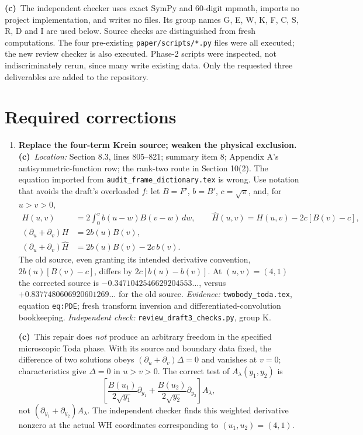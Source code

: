 \documentclass[11pt,a4paper]{article}
\newcommand{\C}{\textbf{(c)}\ }
\newcommand{\file}[1]{\nolinkurl{#1}}
\newcommand{\test}[1]{\textit{Independent check:} \file{review_draft3_checks.py}, group #1.}
\begin{document}
\C The independent checker uses exact SymPy and 60-digit mpmath, imports
no project implementation, and writes no files. Its group names G, E, W,
K, F, C, S, R, D and I are used below. Source checks are distinguished from
fresh computations. The four pre-existing \file{paper/scripts/*.py} files
were all executed; the new review checker is also executed. Phase-2 scripts
were inspected, not indiscriminately rerun, since many write existing data.
Only the requested three deliverables are added to the repository.

\section{Required corrections}
\begin{enumerate}[label=\textbf{R\arabic*.},leftmargin=*,itemsep=1.2em]

\item \textbf{Replace the four-term Krein source; weaken the physical exclusion.}
\C \textit{Location:} Section 8.3, lines 805--821; summary item 8;
Appendix A's antisymmetric-function row; the rank-two route in Section 10(2).
The equation imported from \file{audit_frame_dictionary.tex} is wrong.
Use notation that avoids the draft's overloaded $f$: let
$B=F'$, $b=B'$, $c=\sqrt\pi$, and, for $u>v>0$,
\begin{align}
 H(u,v)&=2\int_0^v b(u-w)B(v-w)\,dw,\qquad
 \widehat H(u,v)=H(u,v)-2c[B(v)-c],\label{rev:H}\\
 (\partial_u+\partial_v)H&=2b(u)B(v),\\
 (\partial_u+\partial_v)\widehat H&=2b(u)B(v)-2c\,b(v).
 \label{rev:source}
\end{align}
The old source, even granting its intended derivative convention,
$2b(u)[B(v)-c]$, differs by $2c[b(u)-b(v)]$.
At $(u,v)=(4,1)$ the corrected source is
$-0.3471042546629204553\ldots$, versus
$+0.8377480606920601269\ldots$ for the old source.
\textit{Evidence:} \file{twobody_toda.tex}, equation \file{eq:PDE};
fresh transform inversion and differentiated-convolution bookkeeping.
\test{K}

\C This repair does \emph{not} produce an arbitrary freedom in the
specified microscopic Toda phase. With its source and boundary data fixed,
the difference of two solutions obeys
$(\partial_u+\partial_v)\Delta=0$ and vanishes at $v=0$;
characteristics give $\Delta=0$ in $u>v>0$.
The correct test of $A_\lambda(y_1,y_2)$ is
\[
 \left[\frac{B(u_1)}{2\sqrt{y_1}}\partial_{y_1}
       +\frac{B(u_2)}{2\sqrt{y_2}}\partial_{y_2}\right]A_\lambda,
\]
not $(\partial_{y_1}+\partial_{y_2})A_\lambda$.
The independent checker finds this weighted derivative nonzero at the
actual WH coordinates corresponding to $(u_1,u_2)=(4,1)$.


\end{enumerate}
\end{document}
